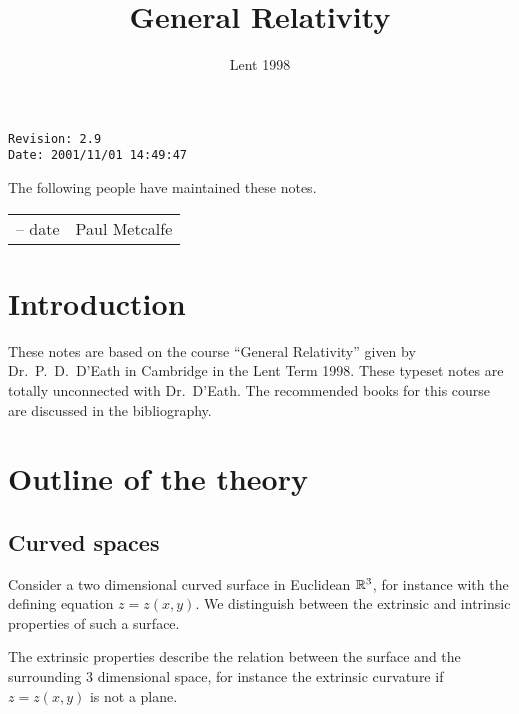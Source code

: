 \documentclass{notes}
\begin{document}
\frontmatter

\title{General Relativity}

\date{Lent 1998} \maketitle

\thispagestyle{empty}

\noindent\verb$Revision: 2.9 $\hfill\\
\noindent\verb$Date: 2001/11/01 14:49:47 $\hfill

\vspace{1.5in}

The following people have maintained these notes.

\begin{center}
\begin{tabular}{ r  l}
-- date & Paul Metcalfe
\end{tabular}
\end{center}

\tableofcontents

\chapter{Introduction}

These notes are based on the course ``General Relativity'' given by
Dr.~P.~D.~D'Eath in Cambridge in the Lent Term 1998.  These typeset
notes are totally unconnected with Dr.~D'Eath.  The recommended books
for this course are discussed in the bibliography.

\alsoavailable
\archimcopyright

\mainmatter

\chapter{Outline of the theory}

\section{Curved spaces}

Consider a two dimensional curved surface in Euclidean $\mathbb{R}^3$, for
instance with the defining equation $z = z(x,y)$.  We distinguish
between the extrinsic and intrinsic properties of such a surface.

The extrinsic properties describe the relation between the surface and the
surrounding 3 dimensional space, for instance the extrinsic
curvature if $z = z(x,y)$ is not a plane.
\end{document}
